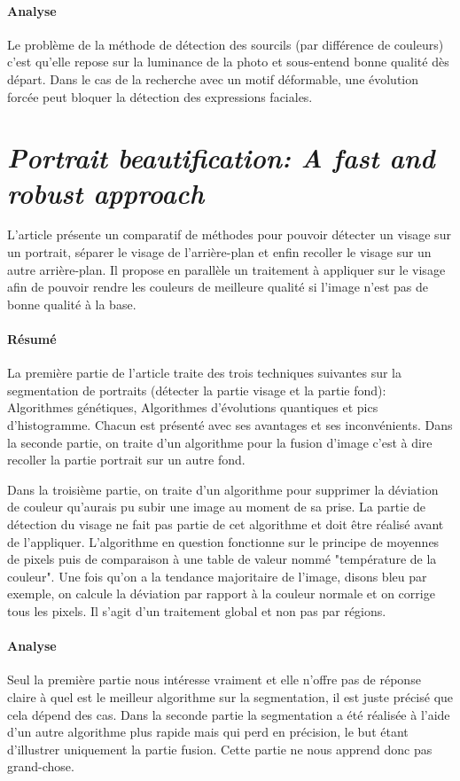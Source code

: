 \documentclass[11pt, french]{report-rd-info}
\begin{document}
\paragraph{Analyse}
Le problème de la méthode de détection des sourcils (par différence de couleurs) c’est qu’elle repose sur la luminance de la photo et sous-entend bonne qualité dès départ.
Dans le cas de la recherche avec un motif déformable, une évolution forcée peut bloquer la détection des expressions faciales.

\section{\emph{Portrait beautification: A fast and robust approach}}
L'article \cite{Liu2007} présente un comparatif de méthodes pour pouvoir détecter un visage sur un portrait, séparer le visage de l'arrière-plan et enfin recoller le visage sur un autre arrière-plan. Il propose en parallèle un traitement à appliquer sur le visage afin de pouvoir rendre les couleurs de meilleure qualité si l'image n'est pas de bonne qualité à la base.

\paragraph{Résumé}
La première partie de l'article traite des trois techniques suivantes sur la segmentation de portraits (détecter la partie visage et la partie fond): Algorithmes génétiques, Algorithmes d'évolutions quantiques et pics d'histogramme. Chacun est présenté avec ses avantages et ses inconvénients.
Dans la seconde partie, on traite d'un algorithme pour la fusion d'image c'est à dire recoller la partie portrait sur un autre fond.

Dans la troisième partie, on traite d'un algorithme pour supprimer la déviation de couleur qu'aurais pu subir une image au moment de sa prise. La partie de détection du visage ne fait pas partie de cet algorithme et doit être réalisé avant de l'appliquer. L'algorithme en question fonctionne sur le principe de moyennes de pixels puis de comparaison à une table de valeur nommé "température de la couleur". Une fois qu'on a la tendance majoritaire de l'image, disons bleu par exemple, on calcule la déviation par rapport à la couleur normale et on corrige tous les pixels. Il s'agit d'un traitement global et non pas par régions.

\paragraph{Analyse}
Seul la première partie nous intéresse vraiment et elle n'offre pas de réponse claire à quel est le meilleur algorithme sur la segmentation, il est juste précisé que cela dépend des cas.
Dans la seconde partie la segmentation a été réalisée à l'aide d'un autre algorithme plus rapide mais qui perd en précision, le but étant d'illustrer uniquement la partie fusion. Cette partie ne nous apprend donc pas grand-chose.
\end{document}
